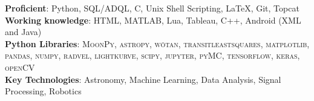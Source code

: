 \documentclass[11pt]{res} %
\newcommand{\titlegap}{5pt} %
\begin{document}
\begin{resume}
\vspace{0.1in} 

\textbf{Proficient}: Python, SQL/ADQL, C, Unix Shell Scripting, \LaTeX, Git, Topcat
\vspace{0.05in}\\
\textbf{Working knowledge}: HTML, MATLAB, Lua, Tableau, C++, Android (XML and Java)
\vspace{0.05in}\\
\textbf{Python Libraries}: \textsc{MoonPy}, \textsc{astropy}, \textsc{wōtan}, \textsc{transitleastsquares}, \textsc{matplotlib}, \textsc{pandas}, \textsc{numpy}, \textsc{radvel}, \textsc{lightkurve}, \textsc{scipy}, \textsc{jupyter}, \textsc{pyMC}, \textsc{tensorflow}, \textsc{keras}, \textsc{openCV}
\vspace{0.05in}\\
\textbf{Key Technologies}: Astronomy, Machine Learning,  Data Analysis, Signal Processing, Robotics

\vspace{0.1in}
\hline




\end{resume} 
\end{document}
